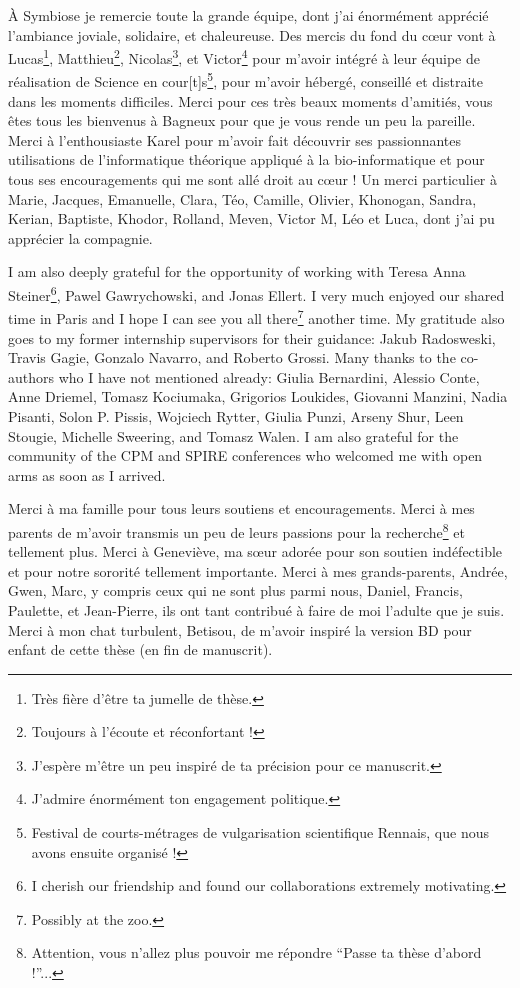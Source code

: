 À Symbiose je remercie toute la grande équipe, dont j'ai énormément apprécié l’ambiance joviale, solidaire, et chaleureuse.
Des mercis du fond du cœur vont à Lucas\footnote{Très fière d’être ta jumelle de thèse.}, Matthieu\footnote{Toujours à l'écoute et réconfortant !},  Nicolas\footnote{J’espère m’être un peu inspiré de ta précision pour ce manuscrit.}, et Victor\footnote{J’admire énormément ton engagement politique.}  pour m’avoir intégré à leur équipe de réalisation de Science en cour[t]s\footnote{Festival de courts-métrages de vulgarisation scientifique Rennais, que nous avons ensuite organisé !}, pour m’avoir hébergé, conseillé et distraite dans les moments difficiles. Merci pour ces très beaux moments d’amitiés, vous êtes tous les bienvenus à Bagneux pour que je vous rende un peu la pareille.
Merci à l’enthousiaste Karel pour m’avoir fait découvrir ses passionnantes utilisations de l’informatique théorique appliqué à la bio-informatique et pour tous ses encouragements qui me sont allé droit au cœur !
Un merci particulier à Marie, Jacques, Emanuelle, Clara, Téo, Camille, Olivier, Khonogan, Sandra, Kerian, Baptiste, Khodor, Rolland, Meven, Victor M, Léo et Luca, dont j’ai pu apprécier la compagnie.


I am also deeply grateful for the opportunity of working with Teresa Anna Steiner\footnote{I cherish our friendship and found our collaborations extremely motivating.}, Pawel Gawrychowski, and Jonas Ellert. I very much enjoyed our shared time in Paris and I hope I can see you all there\footnote{Possibly at the zoo.} another time.
My gratitude also goes to my former internship supervisors for their guidance: Jakub Radosweski, Travis Gagie, Gonzalo Navarro, and Roberto Grossi.
Many thanks to the co-authors who I have not mentioned already: Giulia Bernardini, Alessio Conte, Anne Driemel, Tomasz Kociumaka, Grigorios Loukides, Giovanni Manzini, Nadia Pisanti, Solon P. Pissis, Wojciech Rytter, Giulia Punzi, Arseny Shur, Leen Stougie, Michelle Sweering, and Tomasz Walen.
I am also grateful for the community of the CPM and SPIRE conferences who welcomed me with open arms as soon as I arrived.


Merci à ma famille pour tous leurs soutiens et encouragements. Merci à mes parents de m’avoir transmis un peu de leurs passions pour la recherche\footnote{Attention, vous n’allez plus pouvoir me répondre ``Passe ta thèse d’abord !''...} et tellement plus. Merci à Geneviève, ma sœur adorée pour son soutien indéfectible et pour notre sororité tellement importante. Merci à mes grands-parents, Andrée, Gwen, Marc, y compris ceux qui ne sont plus parmi nous, Daniel, Francis, Paulette, et Jean-Pierre, ils ont tant contribué à faire de moi l’adulte que je suis. Merci à mon chat turbulent, Betisou, de m’avoir inspiré la version BD pour enfant de cette thèse (en fin de manuscrit).

